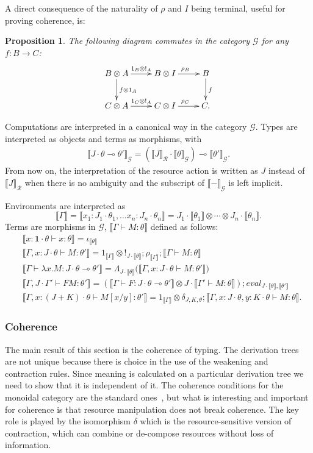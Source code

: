 \documentclass{article}
\newcommand{\sbr}[1]{\llbracket {#1}\rrbracket}
\newtheorem{proposition}[theorem]{Proposition}
\begin{document}
A direct consequence of the naturality of $\rho$ and $I$ being terminal, useful for proving coherence, is:
\begin{proposition}\label{prop:wk}
The following diagram commutes in the category $\mathcal G$ for any $f:B\rightarrow C$:
\[
\xymatrix{
B\ar[r]^-{1_B\otimes !_A}\otimes A \ar[d]^{f\otimes 1_A} & B\otimes I \ar[r]^{\rho_B}& B\ar[d]^f\\
C\otimes A \ar[r]^-{1_C\otimes !_A} & C\otimes I \ar[r]^{\rho_C} & C.
}
\]
\end{proposition}

Computations are interpreted in a canonical way in the category $\mathcal G$. Types are interpreted as objects and terms as morphisms, with 
\begin{align*}
\sbr{J\cdot\theta\multimap\theta'}_{\mathcal G}= (\sbr J_{\mathcal R}\cdot\sbr\theta_{\mathcal G})\multimap\sbr{\theta'}_{\mathcal G}.
\end{align*}
From now on,  the interpretation of the resource action is written as $J$ instead of  $\sbr J_{\mathcal R}$ when there is no ambiguity and the subscript of $\sbr-_{\mathcal G}$ is left implicit. 

Environments are interpreted as
\[
\sbr\Gamma=\sbr{x_1:J_1\cdot\theta_1,\ldots x_n:J_n\cdot \theta_n}
  = J_1\cdot\sbr{\theta_1}\otimes\cdots\otimes J_n\cdot\sbr{\theta_n}.
\]
Terms are morphisms in $\mathcal G$, $\sbr{\Gamma\vdash M:\theta}$ defined as follows:
\begin{align*}
  & \sbr{x:\mathbf 1\cdot\theta\vdash x:\theta} = \iota_{\sbr\theta}  \\
  & \sbr{\Gamma,x:J\cdot\theta \vdash M:\theta'} = 1_{\sbr\Gamma}\otimes !_{J\cdot\sbr\theta};\rho_{\sbr\Gamma};\sbr{\Gamma\vdash M:\theta}   \\
  & \sbr{\Gamma\vdash\lambda x.M:J\cdot\theta\multimap\theta'}
  = \Lambda_{J\cdot\sbr\theta}\bigl( \sbr{\Gamma, x:J\cdot\theta\vdash M:\theta'} \bigr)\\
  & \sbr{\Gamma,J\cdot\Gamma'\vdash FM:\theta'}=(\sbr{\Gamma\vdash F:J\cdot\theta\multimap\theta'}\otimes
  J\cdot\sbr{\Gamma'\vdash M:\theta});\mathit{eval}_{J\cdot\sbr\theta,\sbr{\theta'}}\\
  & \sbr{\Gamma,x:(J+ K)\cdot\theta\vdash M[x/y]:\theta'}=  1_{\sbr\Gamma}\otimes\delta_{J,K, \theta};\sbr{\Gamma,x:J\cdot\theta,y: K\cdot\theta\vdash M:\theta}.
\end{align*}
\subsubsection{Coherence}
The main result of this section is the coherence of  typing. The derivation trees are not unique because there is choice in the use of the weakening and contraction rules. Since meaning is calculated on a particular derivation tree we need to show that it is independent of it. The coherence conditions for the monoidal category are the standard ones~\cite{Kelly64}, but what is interesting and important for coherence is that resource manipulation does not break coherence. The key role is played by the isomorphism $\delta$ which is the resource-sensitive version of contraction, which can combine or de-compose resources without loss of information.  
\end{document}
